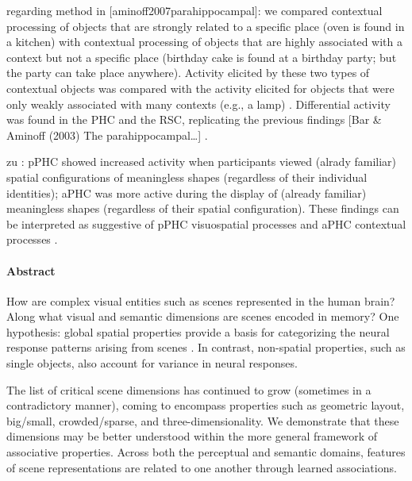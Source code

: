 \documentclass[english]{article}
\begin{document}
\citep{aminoff2013role} regarding method in [aminoff2007parahippocampal]: we
compared contextual processing of objects that are strongly related to a
specific place (oven is found in a kitchen) with contextual processing of
objects that are highly associated with a context but not a specific place
(birthday cake is found at a birthday party; but the party can take place
anywhere)\citep{aminoff2013role}.
%
Activity elicited by these two types of contextual objects was compared with the
activity elicited for objects that were only weakly associated with many
contexts (e.g., a lamp) \citep{aminoff2013role}.
Differential activity was found in the PHC and the RSC, replicating the previous
findings [Bar \& Aminoff (2003) The parahippocampal\dots]
\citep{aminoff2013role}.


\citep{baumann2016functional} zu \citep{aminoff2015associative}:
pPHC showed increased activity when participants viewed (alrady familiar)
spatial configurations of meaningless shapes (regardless of their individual
identities);
aPHC was more active during the display of (already familiar) meaningless shapes
(regardless of their spatial configuration).
%
These findings can be interpreted as suggestive of pPHC visuospatial processes
and aPHC contextual processes \citep{baumann2016functional}.


\paragraph{Abstract}

\citep{aminoff2015associative} How are complex visual entities such as scenes
represented in the human brain? Along what visual and semantic dimensions are
scenes encoded in memory?
%
One hypothesis: global spatial properties provide a basis for categorizing the
neural response patterns arising from scenes \citep{aminoff2015associative}.
%
In contrast, non-spatial properties, such as single objects, also account for
variance in neural responses\citep{aminoff2015associative}.

%
The list of critical scene dimensions has continued to grow (sometimes in a
contradictory manner), coming to encompass properties such as geometric layout,
big/small, crowded/sparse, and
three-dimensionality\citep{aminoff2015associative}.
%
We demonstrate that these dimensions may be better understood within the more
general framework of associative properties\citep{aminoff2015associative}.
%
Across both the perceptual and semantic domains, features of scene
representations are related to one another through learned
associations\citep{aminoff2015associative}.
\end{document}
